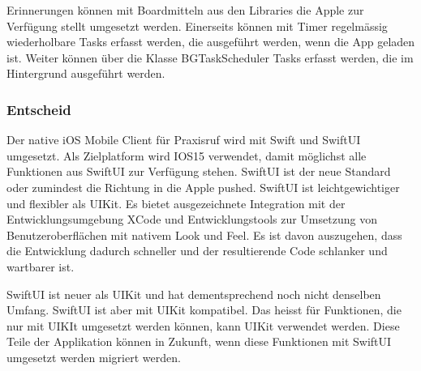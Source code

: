 Erinnerungen können mit Boardmitteln aus den Libraries die Apple zur Verfügung stellt umgesetzt werden.
Einerseits können mit Timer\cite{ios_timer} regelmässig wiederholbare Tasks erfasst werden, die ausgeführt werden, wenn die App geladen ist.
Weiter können über die Klasse BGTaskScheduler\cite{ios_bgtaskscheduler} Tasks erfasst werden, die im Hintergrund ausgeführt werden.

\subsubsection*{Entscheid}

Der native iOS Mobile Client für Praxisruf wird mit Swift und SwiftUI umgesetzt.
Als Zielplatform wird IOS15 verwendet, damit möglichst alle Funktionen aus SwiftUI zur Verfügung stehen.
SwiftUI ist der neue Standard oder zumindest die Richtung in die Apple pushed.
SwiftUI ist leichtgewichtiger und flexibler als UIKit.
Es bietet ausgezeichnete Integration mit der Entwicklungsumgebung XCode und Entwicklungstools zur Umsetzung
von Benutzeroberflächen mit nativem Look und Feel.
Es ist davon auszugehen, dass die Entwicklung dadurch schneller und der resultierende Code schlanker und wartbarer ist.

SwiftUI ist neuer als UIKit und hat dementsprechend noch nicht denselben Umfang.
SwiftUI ist aber mit UIKit kompatibel.
Das heisst für Funktionen, die nur mit UIKIt umgesetzt werden können, kann UIKit verwendet werden.
Diese Teile der Applikation können in Zukunft, wenn diese Funktionen mit SwiftUI umgesetzt werden migriert werden.

\clearpage
